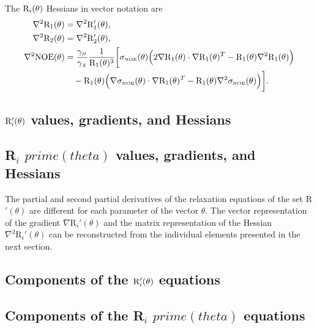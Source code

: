 The $\mathrm{R}_i(\theta)$ Hessians in vector notation are
\begin{subequations}
\begin{align}
    \nabla^2 \mathrm{R}_1(\theta) & = \nabla^2 \mathrm{R}_1'(\theta), \label{eq: Ri trans: d2R1} \\
    \nabla^2 \mathrm{R}_2(\theta) & = \nabla^2 \mathrm{R}_2'(\theta), \label{eq: Ri trans: d2R2} \\
    \nabla^2 \mathrm{NOE}(\theta) & = \frac{\gamma_{\scriptscriptstyle H}}{\gamma_{\scriptscriptstyle X}} \frac{1}{\mathrm{R}_1(\theta)^3} \bigg[
        \sigma_{\scriptscriptstyle \mathrm{NOE}}(\theta) \Big( 2 \nabla \mathrm{R}_1(\theta) \cdot \nabla \mathrm{R}_1(\theta)^T - \mathrm{R}_1(\theta) \nabla^2 \mathrm{R}_1(\theta) \Big) \nonumber\\
        & \quad - \mathrm{R}_1(\theta) \Big( \nabla \sigma_{\scriptscriptstyle \mathrm{NOE}}(\theta) \cdot \nabla \mathrm{R}_1(\theta)^T - \mathrm{R}_1(\theta) \nabla^2 \sigma_{\scriptscriptstyle \mathrm{NOE}}(\theta) \Big)
    \bigg]. \label{eq: Ri trans: d2NOE}
\end{align}
\end{subequations}




\newpage
\begin{latexonly}
    \section{$\mathrm{R}_i'(\theta)$ values, gradients, and Hessians}
\end{latexonly}
\begin{htmlonly}
    \section{R$_i$ $prime(theta)$ values, gradients, and Hessians}
\end{htmlonly}

The partial and second partial derivatives of the relaxation equations of the set R$'(\theta)$ are different for each parameter of the vector $\theta$.  The vector representation of the gradient $\nabla \textrm{R}_i'(\theta)$ and the matrix representation of the Hessian $\nabla^2 \textrm{R}_i'(\theta)$ can be reconstructed from the individual elements presented in the next section.



\begin{latexonly}
    \subsection{Components of the $\mathrm{R}_i'(\theta)$ equations}
\end{latexonly}
\begin{htmlonly}
    \subsection{Components of the R$_i$ $prime(theta)$ equations}
\end{htmlonly}


